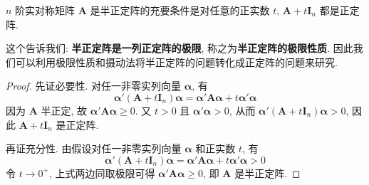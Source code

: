 \documentclass[../../main.tex]{subfiles}
\begin{document}
\begin{proposition}\label{proposition:半正定阵关于摄动的充要条件}
\(n\) 阶实对称矩阵 \(\boldsymbol{A}\) 是半正定阵的充要条件是对任意的正实数 \(t\), \(\boldsymbol{A}+t\boldsymbol{I}_n\) 都是正定阵.
\end{proposition}
\begin{remark}
这个告诉我们: \textbf{半正定阵是一列正定阵的极限}, 称之为\textbf{半正定阵的极限性质}. 因此我们可以利用极限性质和摄动法将半正定阵的问题转化成正定阵的问题来研究.
\end{remark}
\begin{proof}
先证必要性. 对任一非零实列向量 \(\boldsymbol{\alpha}\), 有
\[\boldsymbol{\alpha}'(\boldsymbol{A}+t\boldsymbol{I}_n)\boldsymbol{\alpha}=\boldsymbol{\alpha}'\boldsymbol{A}\boldsymbol{\alpha}+t\boldsymbol{\alpha}'\boldsymbol{\alpha}\]
因为 \(\boldsymbol{A}\) 半正定, 故 \(\boldsymbol{\alpha}'\boldsymbol{A}\boldsymbol{\alpha}\geq0\). 又 \(t>0\) 且 \(\boldsymbol{\alpha}'\boldsymbol{\alpha}>0\), 从而 \(\boldsymbol{\alpha}'(\boldsymbol{A}+t\boldsymbol{I}_n)\boldsymbol{\alpha}>0\), 因此 \(\boldsymbol{A}+t\boldsymbol{I}_n\) 是正定阵.

再证充分性. 由假设对任一非零实列向量 \(\boldsymbol{\alpha}\) 和正实数 \(t\), 有
\[\boldsymbol{\alpha}'(\boldsymbol{A}+t\boldsymbol{I}_n)\boldsymbol{\alpha}=\boldsymbol{\alpha}'\boldsymbol{A}\boldsymbol{\alpha}+t\boldsymbol{\alpha}'\boldsymbol{\alpha}>0\]
令 \(t\to0^+\), 上式两边同取极限可得 \(\boldsymbol{\alpha}'\boldsymbol{A}\boldsymbol{\alpha}\geq0\), 即 \(\boldsymbol{A}\) 是半正定阵. 
\end{proof}
\end{document}

